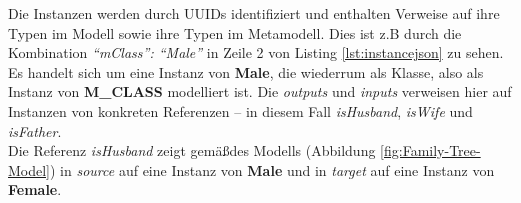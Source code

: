 

Die Instanzen werden durch UUIDs identifiziert und enthalten Verweise auf ihre Typen im Modell sowie ihre Typen im Metamodell. Dies ist z.B durch die Kombination \textit{"`mClass"': "`Male"'} in Zeile 2 von Listing \ref{lst:instancejson} zu sehen. Es handelt sich um eine Instanz von \textbf{Male}, die wiederrum als Klasse, also als Instanz von \textbf{M\_CLASS} modelliert ist. Die \textit{outputs} und \textit{inputs} verweisen hier auf Instanzen von konkreten Referenzen -- in diesem Fall \textit{isHusband}, \textit{isWife} und \textit{isFather}.\\
Die Referenz \textit{isHusband} zeigt gem\"a\ss des Modells (Abbildung \ref{fig:Family-Tree-Model}) in \textit{source} auf eine Instanz von \textbf{Male} und in \textit{target} auf eine Instanz von \textbf{Female}.

